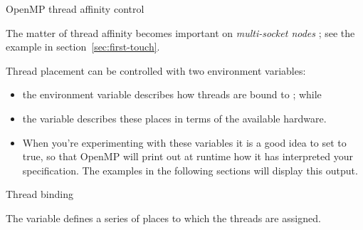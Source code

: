

 {OpenMP thread affinity control}
\label{sec:omp-proc-bind}

The matter of thread affinity becomes important on \emph{multi-socket nodes}%
;
see the example in section~\ref{sec:first-touch}.

Thread placement can be controlled with two environment variables:
\begin{itemize}
\item the environment variable 
  describes how threads are bound to ; while
\item the variable  describes these places
  in terms of the available hardware.
\item When you're experimenting with these variables it is a good idea
  to set  to true, so that OpenMP will
  print out at runtime how it has interpreted your specification.
  The examples in the following sections will display this output.
\end{itemize}

 {Thread binding}
\label{omp:threadbind}

The variable  defines a series of places to
which the threads are assigned.

